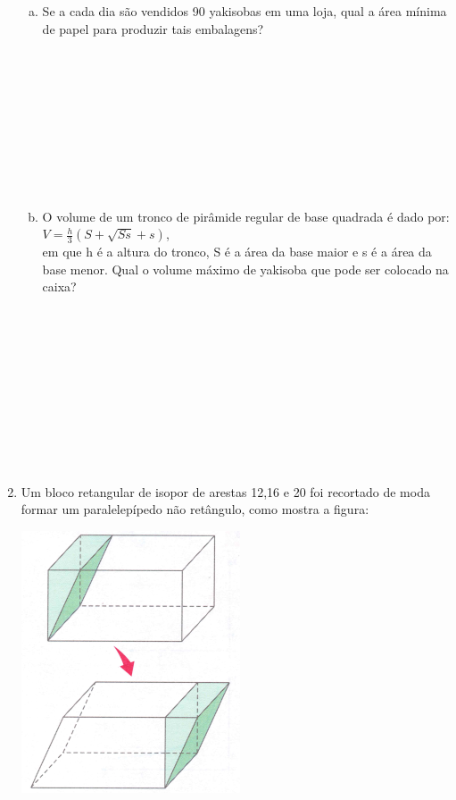 \documentclass[a4paper,14pt]{article}
\begin{document}
\begin{multicols}{2}
\begin{enumerate}
            \begin{enumerate}[a)]
	            \item Se a cada dia são vendidos 90 yakisobas em uma loja, qual a área mínima de papel para produzir tais embalagens?\\\\\\\\\\\\\\\\\\\\
	            \item O volume de um tronco de pirâmide regular de base quadrada é dado por:\\ $V=\frac{h}{3}(S+\sqrt{Ss}+s)$,\\ em que h é a altura do tronco, S é a área da base maior e s é a área da base menor.
	            Qual o volume máximo de yakisoba que pode ser colocado na caixa?\\\\\\\\\\\\\\\\\\\\\\
        	\end{enumerate}
        	\item Um bloco retangular de isopor de arestas 12,16 e 20 foi recortado de moda formar um paralelepípedo não retângulo, como mostra a figura:
        	\begin{center}
        		\includegraphics[width=0.7\linewidth]{8FMA30_imagens/aula30-4}

\end{center}
\end{enumerate}
\end{multicols}
\end{document}
